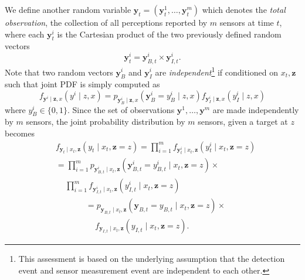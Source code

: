 \documentclass[journal]{IEEEtran}
\begin{document}
We define another random variable $\bm{y}_t=(\bm{y}_t^1,\dots,\bm{y}_t^m)$ 
which denotes the \emph{total observation}, the collection of all perceptions reported by $m$ sensors at time $t$, where each $\bm{y}_t^i$ is the Cartesian product of the two previously defined random vectors
\[
\bm{y}_t^i = \bm{y}_{B,t}^i \times \bm{y}_{I,t}^i.
\]
Note that two random vectors $\bm{y}_B^i$ and $\bm{y}_I^i$ are \emph{independent}\footnote{This assessment is based on the underlying assumption that the detection event and sensor measurement event are independent to each other.} if conditioned on $x_t,\bm{z}$ such that joint PDF is simply
computed as
\[
f_{\bm{y}^i \mid \bm{z},x}(y^i \mid z,x) = p_{\bm{y}_B^i \mid \bm{z},x}(\bm{y}_B^i=y_B^i \mid z,x)f_{\bm{y}_I^i \mid \bm{z},x}(y_I^i \mid z,x)
\]
where $y_B^i \in \lbrace 0,1 \rbrace$.
%
Since the set of observations $\bm{y}^1,\dots,\bm{y}^m$ are made independently by $m$ sensors, the joint probability distribution by $m$ sensors, given a target at $z$ becomes
\begin{align*}
&f_{\bm{y}_t\mid x_t,\bm{z}}
\left(
y_t
 \mid x_t,\bm{z}=z
\right) 
= \prod_{i=1}^m
f_{\bm{y}_t^i\mid x_t,\bm{z}}
\left(
y_t^i \mid x_t,\bm{z}=z \right) \\
&= \prod_{i=1}^m p_{\bm{y}_{B,t}^i\mid x_t,\bm{z}}
\left(
\bm{y}_{B,t}^i=y_{B,t}^i\mid x_t,\bm{z}=z \right) 
\times \\
&\,\,\,\,\,\,\,\prod_{i=1}^m 
f_{\bm{y}_{I,t}^i\mid x_t,\bm{z}}
\left(
y_{I,t}^i
\mid x_t,\bm{z}=z
\right) 
\end{align*}
\begin{align*}
&= p_{\bm{y}_{B,t}\mid x_t,\bm{z}}
\left(
\bm{y}_{B,t}=y_{B,t}
\mid x_t,\bm{z}=z
\right) \times \\
&\,\,\,\,\,\,\,f_{\bm{y}_{I,t}\mid x_t,\bm{z}}
\left(
y_{I,t}
\mid x_t,\bm{z}=z
\right).
\end{align*}
\end{document}

